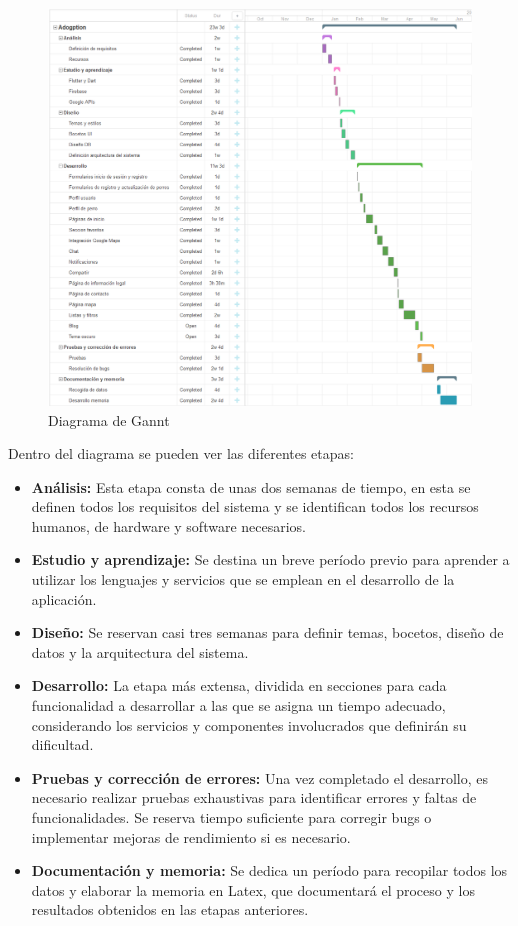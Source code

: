 \documentclass[a4paper, 12pt]{article}
\begin{document}
\begin{figure}[H]
	{\includegraphics[width=15cm]{diagram/GanntSmall2.png}\par}
	\caption{Diagrama de Gannt}
\end{figure}

Dentro del diagrama se pueden ver las diferentes etapas:
\begin{itemize}[noitemsep]
	\item \textbf{Análisis:} Esta etapa consta de unas dos semanas de tiempo, en esta se definen todos los requisitos del sistema y se identifican todos los recursos humanos, de hardware y software necesarios. 
	\item \textbf{Estudio y aprendizaje:} Se destina un breve período previo para aprender a utilizar los lenguajes y servicios que se emplean en el desarrollo de la aplicación.
	\item \textbf{Diseño:} Se reservan casi tres semanas para definir temas, bocetos, diseño de datos y la arquitectura del sistema.
	\item \textbf{Desarrollo:} La etapa más extensa, dividida en secciones para cada funcionalidad a desarrollar a las que se asigna un tiempo adecuado, considerando los servicios y componentes involucrados que definirán su dificultad.
	\item \textbf{Pruebas y corrección de errores:} Una vez completado el desarrollo, es necesario realizar pruebas exhaustivas para identificar errores y faltas de funcionalidades. Se reserva tiempo suficiente para corregir bugs o implementar mejoras de rendimiento si es necesario.
	\item \textbf{Documentación y memoria:} Se dedica un período para recopilar todos los datos y elaborar la memoria en Latex, que documentará el proceso y los resultados obtenidos en las etapas anteriores.
\end{itemize}
\end{document}
